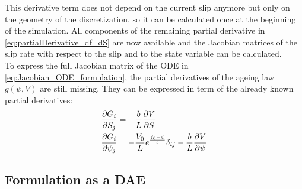 This derivative term does not depend on the current slip anymore but only on the geometry of the discretization, so it can be calculated once at the beginning of the simulation. All components of the remaining partial derivative in \autoref{eq:partialDerivative_df_dS} are now available and the Jacobian matrices of the slip rate with respect to the slip and to the state variable can be calculated. \\
To express the full Jacobian matrix of the ODE in \autoref{eq:Jacobian_ODE_formulation}, the partial derivatives of the ageing law $g(\psi, V)$ are still missing. They can be expressed in term of the already known partial derivatives: 
\begin{align}
\pdv{G_i}{S_j}    &= -\frac{b}{L}\pdv{V}{S} \\
\pdv{G_i}{\psi_j} &= -\frac{V_0}{L}e^{\frac{f_0 - \psi}{b}}\delta_{ij} -
\frac{b}{L}\pdv{V}{\psi}
\end{align}



\subsection{Formulation as a DAE}
